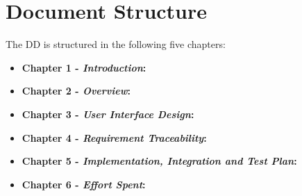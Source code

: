 \section{Document Structure}

The DD is structured in the following five chapters:
\begin{itemize}
\item \textbf{Chapter 1 -  \textit{Introduction}:} 

\item \textbf{Chapter 2 -  \textit{Overview}:} 

\item \textbf{Chapter 3 -  \textit{User Interface Design}:} 

\item \textbf{Chapter 4 -  \textit{Requirement Traceability}:} 

\item \textbf{Chapter 5 -  \textit{Implementation, Integration and Test Plan}:}

\item \textbf{Chapter 6 -  \textit{Effort Spent}:} 
\end{itemize}